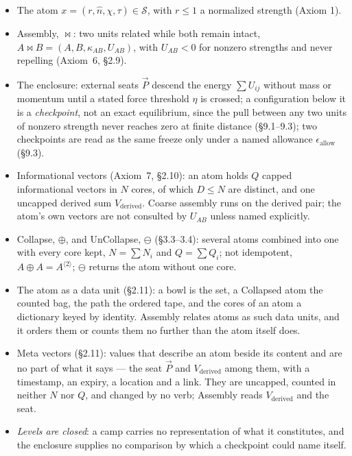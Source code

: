 \documentclass[12pt, a4paper]{article}
\begin{document}
\begin{itemize}
\item The atom $x=(r,\hat n,\chi,\tau)\in\mathcal{S}$, with $r\le 1$
      a normalized strength (Axiom 1).
\item Assembly, $\bowtie$: two units related while both remain
      intact, $A\bowtie B=(A,B,\kappa_{AB},U_{AB})$, with
      $U_{AB}<0$ for nonzero strengths and never repelling (Axiom~6, \S2.9).
\item The enclosure: external seats $\vec P$ descend the energy
      $\sum U_{ij}$ without mass or momentum until a stated force
      threshold $\eta$ is crossed; a configuration below it is a
      \emph{checkpoint}, not an exact equilibrium, since the pull
      between any two units of nonzero strength never reaches zero
      at finite distance (\S9.1--9.3); two checkpoints are read as the same freeze only under a
      named allowance $\epsilon_{\text{allow}}$ (\S9.3).
\item Informational vectors (Axiom~7, \S2.10): an atom holds $Q$
      capped informational vectors in $N$ cores, of which $D\le N$ are
      distinct, and one uncapped derived sum $V_{\mathrm{derived}}$.
      Coarse assembly runs on the derived pair; the atom's own
      vectors are not consulted by $U_{AB}$ unless named explicitly.
\item Collapse, $\oplus$, and UnCollapse, $\ominus$ (\S3.3--3.4):
      several atoms combined into one with every core kept,
      $N=\sum N_i$ and $Q=\sum Q_i$; not idempotent,
      $A\oplus A=A^{\langle 2\rangle}$; $\ominus$ returns the atom
      without one core.
\item The atom as a data unit (\S2.11): a bowl is the set, a Collapsed atom the counted bag, the path the ordered tape, and the cores of an atom a dictionary keyed by identity. Assembly relates atoms as such data units, and it orders them or counts them no further than the atom itself does.
\item Meta vectors (\S2.11): values that describe an atom beside its
      content and are no part of what it says --- the seat $\vec P$
      and $V_{\mathrm{derived}}$ among them, with a timestamp, an
      expiry, a location and a link. They are uncapped, counted in
      neither $N$ nor $Q$, and changed by no verb; Assembly reads
      $V_{\mathrm{derived}}$ and the seat.
\item \emph{Levels are closed}: a camp carries no representation of
      what it constitutes, and the enclosure supplies no comparison
      by which a checkpoint could name itself.
\end{itemize}
\end{document}
